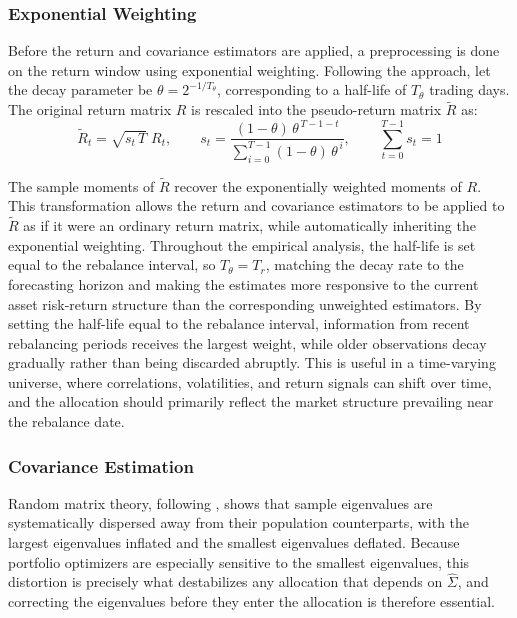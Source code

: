 \documentclass[12pt]{article}
\begin{document}
\subsubsection{Exponential Weighting}
Before the return and covariance estimators are applied, a preprocessing is done on the return window using exponential weighting. Following the \cite{riskmetrics1996} approach, let the decay parameter be $\theta = 2^{-1/T_\theta}$, corresponding to a half-life of $T_\theta$ trading days. The original return matrix $R$ is rescaled into the pseudo-return matrix $\tilde{R}$ as:
\begin{equation}
  \tilde{R}_{t} = \sqrt{s_t \, T}\; R_{t}, \qquad
  s_t = \frac{(1-\theta)\,\theta^{\,T-1-t}}{\sum_{i=0}^{T-1}(1-\theta)\,\theta^{\,i}}, 
  \qquad 
  \sum_{t=0}^{T-1} s_t = 1 
  \label{eq:ewma-pseudo}
\end{equation}

The sample moments of $\tilde{R}$ recover the exponentially weighted moments of $R$. This transformation allows the return and covariance estimators to be applied to $\tilde{R}$ as if it were an ordinary return matrix, while automatically inheriting the exponential weighting. Throughout the empirical analysis, the half-life is set equal to the rebalance interval, so $T_\theta=T_r$, matching the decay rate to the forecasting horizon and making the estimates more responsive to the current asset risk-return structure than the corresponding unweighted estimators. By setting the half-life equal to the rebalance interval, information from recent rebalancing periods receives the largest weight, while older observations decay gradually rather than being discarded abruptly. This is useful in a time-varying universe, where correlations, volatilities, and return signals can shift over time, and the allocation should primarily reflect the market structure prevailing near the rebalance date.

\subsubsection{Covariance Estimation}
Random matrix theory, following \citet{marchenkopastur1967}, shows that sample eigenvalues are systematically dispersed away from their population counterparts, with the largest eigenvalues inflated and the smallest eigenvalues deflated. Because portfolio optimizers are especially sensitive to the smallest eigenvalues, this distortion is precisely what destabilizes any allocation that depends on $\hat{\Sigma}$, and correcting the eigenvalues before they enter the allocation is therefore essential.
\end{document}
